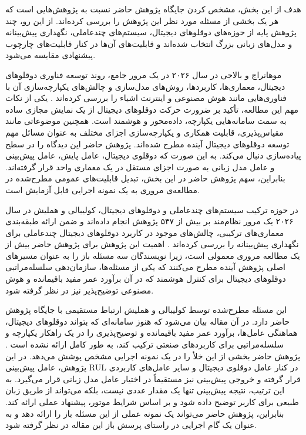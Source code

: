 هدف از این بخش، مشخص کردن جایگاه پژوهش حاضر نسبت به پژوهش‌هایی است که هر یک بخشی از مسئله مورد نظر این پژوهش را بررسی کرده‌اند. از این رو، چند پژوهش پایه از حوزه‌های دوقلوهای دیجیتال، سیستم‌های چندعاملی، نگهداری پیش‌بینانه و مدل‌های زبانی بزرگ انتخاب شده‌اند و قابلیت‌های آن‌ها در کنار قابلیت‌های چارچوب پیشنهادی مقایسه می‌شود.

موهانراج
 و
بالاجی
در سال ۲۰۲۶ در یک مرور جامع، روند توسعه فناوری
دوقلوهای دیجیتال، معماری‌ها، کاربردها، روش‌های مدل‌سازی و چالش‌های
یکپارچه‌سازی آن با فناوری‌هایی مانند هوش مصنوعی و اینترنت اشیاء را
بررسی کرده‌اند \cite{mohanraj2026digitaltwin}. یکی از نکات مهم این
مطالعه، تأکید بر ضرورت حرکت دوقلوهای دیجیتال از یک نمایش مجازی ساده به
سمت سامانه‌هایی یکپارچه، داده‌محور و هوشمند است. همچنین موضوعاتی مانند
مقیاس‌پذیری، قابلیت همکاری و یکپارچه‌سازی اجزای مختلف به عنوان مسائل
مهم توسعه دوقلوهای دیجیتال آینده مطرح شده‌اند. پژوهش حاضر این دیدگاه
را در سطح پیاده‌سازی دنبال می‌کند. به این صورت که دوقلوی دیجیتال،
عامل پایش، عامل پیش‌بینی و عامل مدل زبانی به صورت اجزای مستقل در یک معماری واحد قرار گرفته‌اند. بنابراین، سهم پژوهش حاضر
در این بخش، تبدیل قابلیت‌های عمومی مطرح‌شده در مطالعه‌ی مروری به یک
نمونه اجرایی قابل آزمایش است.

در حوزه ترکیب سیستم‌های چندعاملی و دوقلوهای دیجیتال،
کولیبالی
و
هملیش
در سال ۲۰۲۶ یک مرور نظام‌مند بر بیش از ۵۴۷ پژوهش انجام داده‌اند
و ضمن ارائه طبقه‌بندی معماری‌های ترکیبی، چالش‌های موجود در کاربرد
دوقلوهای دیجیتال چندعاملی برای نگهداری پیش‌بینانه را بررسی کرده‌اند
\cite{coulibaly2026madtdt}. اهمیت این پژوهش برای پژوهش حاضر
بیش از یک مطالعه مروری معمولی است، زیرا نویسندگان سه مسئله باز را به
عنوان مسیرهای اصلی پژوهش آینده مطرح می‌کنند که یکی از مسئله‌ها، سازمان‌دهی سلسله‌مراتبی دوقلوهای دیجیتال برای کنترل هوشمند که در آن برآورد عمر مفید باقیمانده و هوش مصنوعی توضیح‌پذیر نیز در نظر گرفته شود.

این مسئله مطرح‌شده توسط کولیبالی و هملیش ارتباط مستقیمی با جایگاه
پژوهش حاضر دارد. در آن مقاله بیان می‌شود که هنوز سامانه‌ای که بتواند
دوقلوهای دیجیتال، هماهنگی عامل‌ها، برآورد عمر مفید باقیمانده و
توضیح‌پذیری را در یک راهکار یکپارچه و سلسله‌مراتبی برای کاربردهای
صنعتی ترکیب کند، به طور کامل ارائه نشده است
\cite{coulibaly2026madtdt}. پژوهش حاضر بخشی از این خلأ را در یک
نمونه اجرایی مشخص پوشش می‌دهد. در این پژوهش، عامل پیش‌بینی \gls{RUL} در
کنار عامل دوقلوی دیجیتال و سایر عامل‌های کاربردی قرار گرفته و خروجی
پیش‌بینی نیز مستقیماً در اختیار عامل مدل زبانی قرار می‌گیرد. به این
ترتیب، نتیجه پیش‌بینی تنها یک مقدار عددی نیست، بلکه می‌تواند از طریق زبان طبیعی برای کاربر توضیح داده شود و بر اساس شرایط موتور، پیشنهاد عملی ارائه کند. بنابراین، پژوهش حاضر می‌تواند یک نمونه عملی از این مسئله باز را ارائه دهد و به عنوان یک گام اجرایی در راستای پرسش باز این مقاله در نظر گرفته شود.

